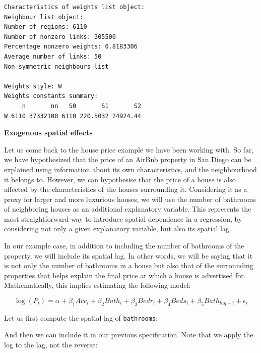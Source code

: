 \documentclass[
  letterpaper,
  DIV=11,
  numbers=noendperiod,
  oneside]{scrreprt}
\newenvironment{Shaded}{\begin{snugshade}}{\end{snugshade}}
\newcommand{\FunctionTok}[1]{\textcolor[rgb]{0.28,0.35,0.67}{#1}}
\newcommand{\NormalTok}[1]{\textcolor[rgb]{0.00,0.23,0.31}{#1}}
\newcommand{\OtherTok}[1]{\textcolor[rgb]{0.00,0.23,0.31}{#1}}
\newcommand{\SpecialCharTok}[1]{\textcolor[rgb]{0.37,0.37,0.37}{#1}}
\begin{document}
\begin{verbatim}
Characteristics of weights list object:
Neighbour list object:
Number of regions: 6110 
Number of nonzero links: 305500 
Percentage nonzero weights: 0.8183306 
Average number of links: 50 
Non-symmetric neighbours list

Weights style: W 
Weights constants summary:
     n       nn   S0       S1       S2
W 6110 37332100 6110 220.5032 24924.44
\end{verbatim}

\textbf{Exogenous spatial effects}

Let us come back to the house price example we have been working with.
So far, we have hypothesized that the price of an AirBnb property in San
Diego can be explained using information about its own characteristics,
and the neighbourhood it belongs to. However, we can hypothesise that
the price of a house is also affected by the characteristics of the
houses surrounding it. Considering it as a proxy for larger and more
luxurious houses, we will use the number of bathrooms of neighboring
houses as an additional explanatory variable. This represents the most
straightforward way to introduce spatial dependence in a regression, by
considering not only a given explanatory variable, but also its spatial
lag.

In our example case, in addition to including the number of bathrooms of
the property, we will include its spatial lag. In other words, we will
be saying that it is not only the number of bathrooms in a house but
also that of the surrounding properties that helps explain the final
price at which a house is advertised for. Mathematically, this implies
estimating the following model:

\[
\log(P_i) = \alpha + \beta_1 Acc_i + \beta_2 Bath_i + \beta_3 Bedr_i + \beta_4 Beds_i+ \beta_5 Bath_{lag-i} + \epsilon_i
\]

Let us first compute the spatial lag of \texttt{bathrooms}:

\begin{Shaded}
\end{Shaded}

And then we can include it in our previous specification. Note that we
apply the log to the lag, not the reverse:
\end{document}
